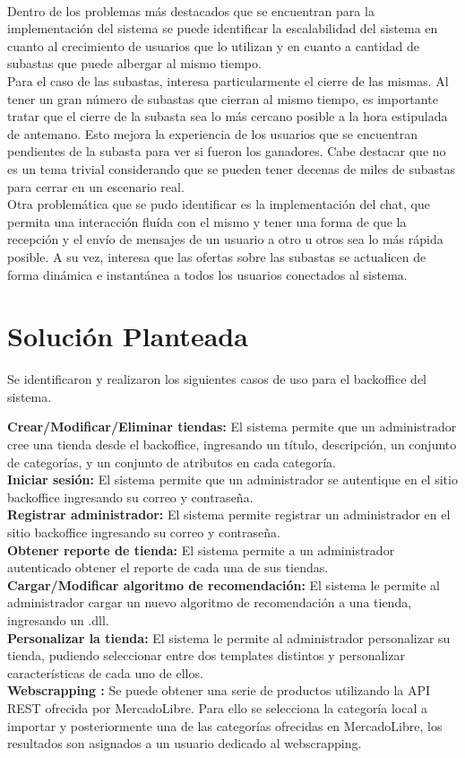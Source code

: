 \documentclass[journal]{IEEEtran}
\begin{document}
\\
Dentro de los problemas más destacados que se encuentran para la implementación del sistema se puede identificar la escalabilidad del sistema en cuanto al crecimiento de usuarios que lo utilizan y en cuanto a cantidad de subastas que puede albergar al mismo tiempo.
\\
Para el caso de las subastas, interesa particularmente el cierre de las mismas. Al tener un gran número de subastas que cierran al mismo tiempo, es importante tratar que el cierre de la subasta sea lo más cercano posible a la hora estipulada de antemano. Esto mejora la experiencia de los usuarios que se encuentran pendientes de la subasta para ver si fueron los ganadores. Cabe destacar que no es un tema trivial considerando que se pueden tener decenas de miles de subastas para cerrar en un escenario real.
\\
Otra problemática que se pudo identificar es la implementación del chat, que permita una interacción fluída con el mismo y tener una forma de que la recepción y el envío de mensajes de un usuario a otro u otros sea lo más rápida posible. A su vez, interesa que las ofertas sobre las subastas se actualicen de forma dinámica e instantánea a todos los usuarios conectados al sistema.


\section{Solución Planteada}
Se identificaron y realizaron los siguientes casos de uso para el backoffice del sistema.

\textbf{Crear/Modificar/Eliminar tiendas:} El sistema permite que un administrador cree una tienda desde el backoffice, ingresando un título, descripción, un conjunto de categorías, y un conjunto de atributos en cada categoría. 
\\
\textbf{Iniciar sesión:} El sistema permite que un administrador se autentique en el sitio backoffice ingresando su correo y contraseña.
\\
\textbf{Registrar administrador:} El sistema permite registrar un administrador en el sitio backoffice ingresando su correo y contraseña.
\\
\textbf{Obtener reporte de tienda:} El sistema permite a un administrador autenticado obtener el reporte de cada una de sus tiendas.
\\
\textbf{Cargar/Modificar algoritmo de recomendación:} El sistema le permite al administrador cargar un nuevo algoritmo de recomendación a una tienda, ingresando un .dll.
\\
\textbf{Personalizar la tienda:} El sistema le permite al administrador personalizar su tienda, pudiendo seleccionar entre dos templates distintos y personalizar características de cada uno de ellos.
\\
\textbf{Webscrapping :} Se puede obtener una serie de productos utilizando la API REST\cite{url:apiml} ofrecida por MercadoLibre. Para ello se selecciona la categoría local a importar y posteriormente una de las categorías ofrecidas en MercadoLibre, los resultados son asignados a un usuario dedicado al webscrapping.
\end{document}
